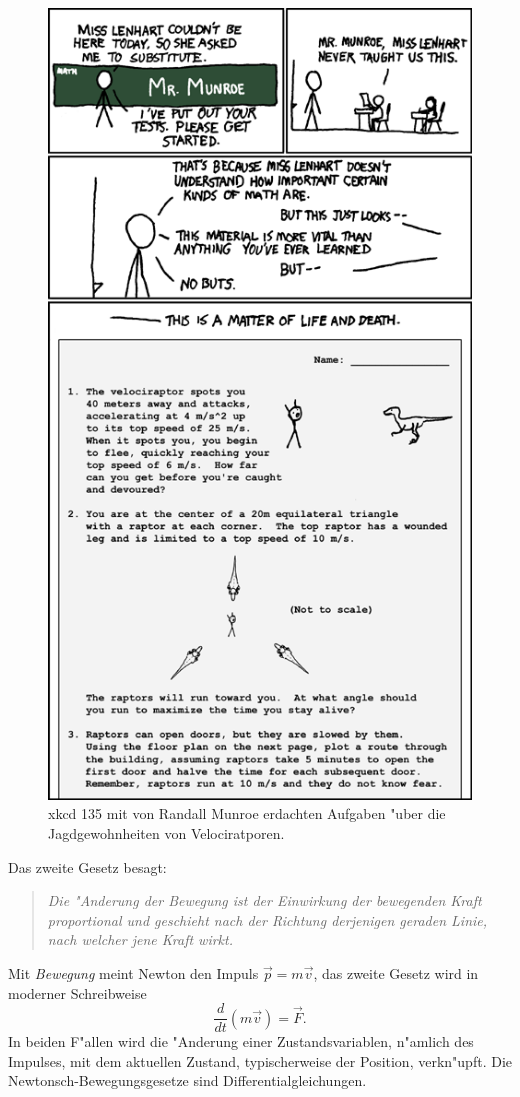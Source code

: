 \begin{figure}
\centering
\includegraphics[width=0.7\hsize]{chapters/substitute.png}
\caption{xkcd 135 mit von Randall Munroe erdachten Aufgaben "uber die
Jagdgewohnheiten von Velociratporen.
\label{einleitung:xkcd135}}
\end{figure}%


Das zweite Gesetz besagt:
\begin{quote}
\em
Die "Anderung der Bewegung ist der Einwirkung der bewegenden Kraft
proportional und geschieht nach der Richtung derjenigen geraden Linie,
nach welcher jene Kraft wirkt.
\end{quote}
Mit {\em Bewegung}
meint Newton den Impuls $\vec{p}=m\vec{v}$,
das zweite Gesetz wird in moderner Schreibweise
\[
\frac{d}{dt}(m\vec{v}) = \vec{F}.
\]
In beiden F"allen wird die "Anderung einer Zustandsvariablen, n"amlich
des Impulses, mit dem aktuellen Zustand, typischerweise der Position,
verkn"upft.
Die Newtonsch-Bewegungsgesetze sind Differentialgleichungen.

